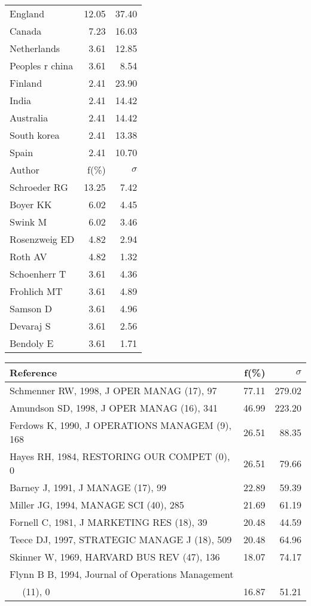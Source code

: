\documentclass[a4paper,11pt]{report}
\begin{document}
\begin{landscape}
\begin{table}[!ht]
{\begin{tabular}{|l r r|}
England & 12.05 & 37.40\\
Canada & 7.23 & 16.03\\
Netherlands & 3.61 & 12.85\\
Peoples r china & 3.61 & 8.54\\
Finland & 2.41 & 23.90\\
India & 2.41 & 14.42\\
Australia & 2.41 & 14.42\\
South korea & 2.41 & 13.38\\
Spain & 2.41 & 10.70\\
\hline
\hline
Author & f(\%) & $\sigma$\\
\hline
Schroeder RG & 13.25 & 7.42\\
Boyer KK & 6.02 & 4.45\\
Swink M & 6.02 & 3.46\\
Rosenzweig ED & 4.82 & 2.94\\
Roth AV & 4.82 & 1.32\\
Schoenherr T & 3.61 & 4.36\\
Frohlich MT & 3.61 & 4.89\\
Samson D & 3.61 & 4.96\\
Devaraj S & 3.61 & 2.56\\
Bendoly E & 3.61 & 1.71\\
\hline
\end{tabular}
}
{\scriptsize\begin{tabular}{|l r r|}
\hline
Reference & f(\%) & $\sigma$\\
\hline
Schmenner RW, 1998, J OPER MANAG (17), 97 & 77.11 & 279.02\\
Amundson SD, 1998, J OPER MANAG (16), 341 & 46.99 & 223.20\\
Ferdows K, 1990, J OPERATIONS MANAGEM (9), 168 & 26.51 & 88.35\\
Hayes RH, 1984, RESTORING OUR COMPET (0), 0 & 26.51 & 79.66\\
Barney J, 1991, J MANAGE (17), 99 & 22.89 & 59.39\\
Miller JG, 1994, MANAGE SCI (40), 285 & 21.69 & 61.19\\
Fornell C, 1981, J MARKETING RES (18), 39 & 20.48 & 44.59\\
Teece DJ, 1997, STRATEGIC MANAGE J (18), 509 & 20.48 & 64.96\\
Skinner W, 1969, HARVARD BUS REV (47), 136 & 18.07 & 74.17\\
Flynn B B, 1994, Journal of Operations Management &  & \\
$\quad$ (11), 0 & 16.87 & 51.21\\

\end{tabular}}
\end{table}
\end{landscape}
\end{document}
